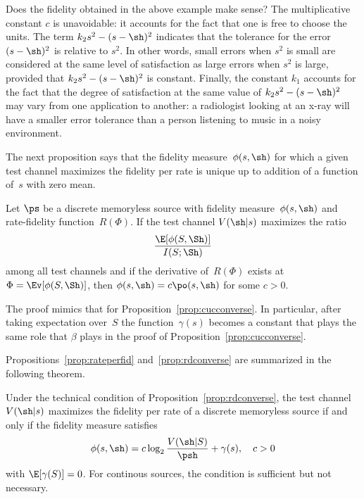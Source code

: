 Does the fidelity obtained in the above example make sense? The multiplicative
constant $c$ is unavoidable: it accounts for the fact that one is free to choose
the units. The term $k_2s^2-(s-\sh)^2$ indicates that the tolerance for the
error $(s-\sh)^2$ is relative to $s^2$. In other words, small errors when $s^2$
is small are considered at the same level of satisfaction as large errors when
$s^2$ is large, provided that $k_2s^2-(s-\sh)^2$ is constant. Finally, the
constant $k_1$ accounts for the fact that the degree of satisfaction at the same
value of $k_2s^2-(s-\sh)^2$ may vary from one application to another: a
radiologist looking at an x-ray will have a smaller error tolerance than a
person listening to music in a noisy environment.

The next proposition says that the fidelity measure~$\phi(s,\sh)$ for which a
given test channel maximizes the fidelity per rate is unique up to addition of a
function of~$s$ with zero mean.

\begin{proposition}
  \label{prop:rdconverse}
  Let $\ps$ be a discrete memoryless source with fidelity measure~$\phi(s,\sh)$
  and rate-fidelity function~$R(\Phi)$. If the test channel $V(\sh|s)$ maximizes
  the ratio
  \[ \frac{\E[\phi(S,\Sh)]}{I(S;\Sh)} \]
  among all test channels and if the derivative of~$R(\Phi)$ exists at $\Phi =
  \Ev[\phi(S,\Sh)]$, then $\phi(s,\sh) = c \po(s,\sh)$ for some $c > 0$.
\end{proposition}

The proof mimics that for Proposition~\ref{prop:cucconverse}. In particular,
after taking expectation over~$S$ the function~$\gamma(s)$ becomes a constant
that plays the same role that $\beta$ plays in the proof of
Proposition~\ref{prop:cucconverse}.

Propositions~\ref{prop:rateperfid} and~\ref{prop:rdconverse} are summarized in
the following theorem.
\begin{theorem}
  \label{thm:rdthm}
  Under the technical condition of Proposition~\ref{prop:rdconverse}, the
  test channel~$V(\sh|s)$ maximizes the fidelity per rate of a
  discrete memoryless source if and only if the fidelity measure satisfies
  \begin{equation}
    \label{eq:optfid}
    \phi(s,\sh) = c \log_2\frac{V(\sh|S)}{\psh} + \gamma(s), \quad c > 0
  \end{equation}
  with $\E[\gamma(S)] = 0$.  For continous sources, the condition is sufficient
  but not necessary.
\end{theorem}

